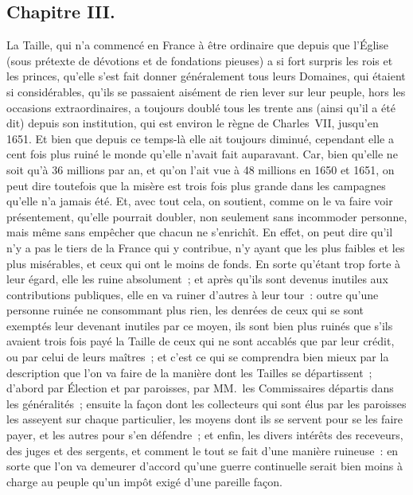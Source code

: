\documentclass[french,twoside]{book} %
\begin{document}
\subsection[{Chapitre III.}]{Chapitre III.}
\noindent La Taille, qui n’a commencé en France à être ordinaire que depuis que l’Église (sous prétexte de dévotions et de fondations pieuses) a si fort surpris les rois et les princes, qu’elle s’est fait donner généralement tous leurs Domaines, qui étaient si considérables, qu’ils se passaient aisément de rien lever sur leur peuple, hors les occasions extraordinaires, a toujours doublé tous les trente ans (ainsi qu’il a été dit) depuis son institution, qui est environ le règne de Charles VII, jusqu’en 1651. Et bien que depuis ce temps-là elle ait toujours diminué, cependant elle a cent fois plus ruiné le monde qu’elle n’avait fait auparavant. Car, bien qu’elle ne soit qu’à 36 millions par an, et qu’on l’ait vue à 48 millions en 1650 et 1651, on peut dire toutefois que la misère est trois fois plus grande dans les campagnes qu’elle n’a jamais été. Et, avec tout cela, on soutient, comme on le va faire voir présentement, qu’elle pourrait doubler, non seulement sans incommoder personne, mais même sans empêcher que chacun ne s’enrichît. En effet, on peut dire qu’il n’y a pas le tiers de la France qui y contribue, n’y ayant que les plus faibles et les plus misérables, et ceux qui ont le moins de fonds. En sorte qu’étant trop forte à leur égard, elle les ruine absolument ; et après qu’ils sont devenus inutiles aux contributions publiques, elle en va ruiner d’autres à leur tour : outre qu’une personne ruinée ne consommant plus rien, les denrées de ceux qui se sont exemptés leur devenant inutiles par ce moyen, ils sont bien plus ruinés que s’ils avaient trois fois payé la Taille de ceux qui ne sont accablés que par leur crédit, ou par celui de leurs maîtres ; et c’est ce qui se comprendra bien mieux par la description que l’on va faire de la manière dont les Tailles se départissent ; d’abord par Élection et par paroisses, par MM. les Commissaires départis dans les généralités ; ensuite la façon dont les collecteurs qui sont élus par les paroisses les asseyent sur chaque particulier, les moyens dont ils se servent pour se les faire payer, et les autres pour s’en défendre ; et enfin, les divers intérêts des receveurs, des juges et des sergents, et comment le tout se fait d’une manière ruineuse : en sorte que l’on va demeurer d’accord qu’une guerre continuelle serait bien moins à charge au peuple qu’un impôt exigé d’une pareille façon.
\end{document}
